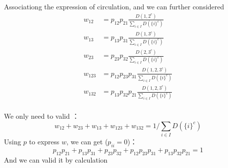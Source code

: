 \documentclass[a4paper,11pt]{article}
\begin{document}
Associationg the expression of circulation, and we can further considered
\begin{align*}
    w_{12} &= p_{12}p_{21} \frac{D({1, 2}^c)}{\sum_{i\in I} D(\{i\}^c)} \\
    w_{13} &= p_{13}p_{31} \frac{D({1, 3}^c)}{\sum_{i\in I} D(\{i\}^c)} \\
    w_{23} &= p_{23}p_{32} \frac{D({2, 3}^c)}{\sum_{i\in I} D(\{i\}^c)} \\
    w_{123} &= p_{12}p_{23}p_{31} \frac{D({1, 2, 3}^c)}{\sum_{i\in I} D(\{i\}^c)} \\
    w_{132} &= p_{13}p_{32}p_{21} \frac{D({1, 2, 3}^c)}{\sum_{i\in I} D(\{i\}^c)} \\
\end{align*}

We only need to valid ：
$$
w_{12} + w_{23} + w_{13} + w_{123} + w_{132} = 1 / \sum_{i\in I} D(\{i\}^c)
$$
Using $p$ to express $w$, we can get ($p_{ii}=0$)：
$$
p_{12}p_{21} + p_{13}p_{31} + p_{23}p_{32} + p_{12}p_{23}p_{31} + p_{13}p_{32}p_{21} = 1
$$
And we can valid it by calculation
\end{document}
